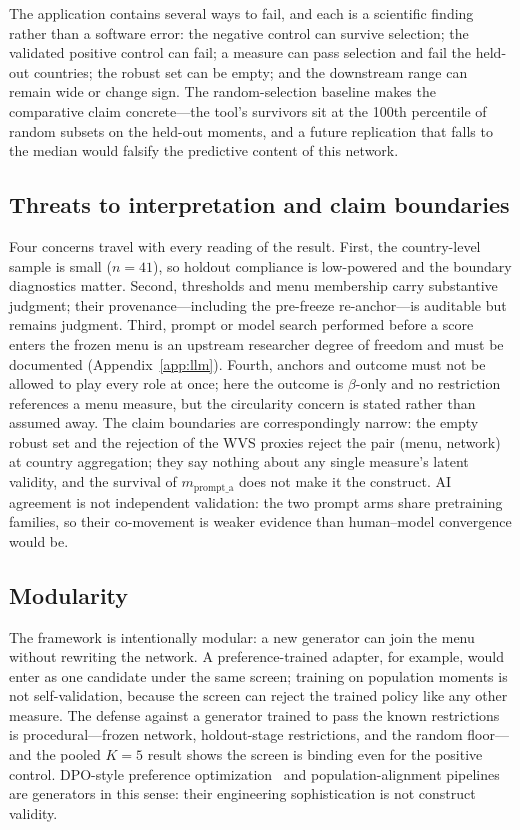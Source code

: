 \documentclass[10pt,letterpaper]{article}
\begin{document}
The application contains several ways to fail, and each is a scientific finding rather than a software error: the negative control can survive selection; the validated positive control can fail; a measure can pass selection and fail the held-out countries; the robust set can be empty; and the downstream range can remain wide or change sign.
The random-selection baseline makes the comparative claim concrete---the tool's survivors sit at the 100th percentile of random subsets on the held-out moments, and a future replication that falls to the median would falsify the predictive content of this network.

\subsection{Threats to interpretation and claim boundaries}
\label{sec:app-threats}

Four concerns travel with every reading of the result.
First, the country-level sample is small ($n=41$), so holdout compliance is low-powered and the boundary diagnostics matter.
Second, thresholds and menu membership carry substantive judgment; their provenance---including the pre-freeze re-anchor---is auditable but remains judgment.
Third, prompt or model search performed before a score enters the frozen menu is an upstream researcher degree of freedom and must be documented (Appendix~\ref{app:llm}).
Fourth, anchors and outcome must not be allowed to play every role at once; here the outcome is $\beta$-only and no restriction references a menu measure, but the circularity concern is stated rather than assumed away.
The claim boundaries are correspondingly narrow: the empty robust set and the rejection of the WVS proxies reject the pair (menu, network) at country aggregation; they say nothing about any single measure's latent validity, and the survival of $m_{\mathrm{prompt\_a}}$ does not make it the construct.
AI agreement is not independent validation: the two prompt arms share pretraining families, so their co-movement is weaker evidence than human--model convergence would be.

\subsection{Modularity}
\label{sec:app-modularity}

The framework is intentionally modular: a new generator can join the menu without rewriting the network.
A preference-trained adapter, for example, would enter as one candidate under the same screen; training on population moments is not self-validation, because the screen can reject the trained policy like any other measure.
The defense against a generator trained to pass the known restrictions is procedural---frozen network, holdout-stage restrictions, and the random floor---and the pooled $K{=}5$ result shows the screen is binding even for the positive control.
DPO-style preference optimization~\cite{rafailov2023} and population-alignment pipelines~\cite{plural2026,palms2026} are generators in this sense: their engineering sophistication is not construct validity.
\end{document}

